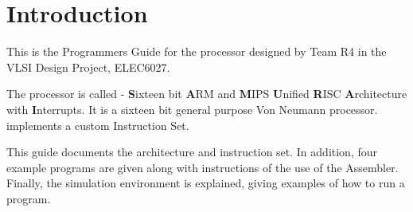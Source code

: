 
\section{Introduction}


This is the Programmers Guide for the processor designed by Team R4 in the VLSI Design Project, ELEC6027. 

The processor is called \samurai{} - \textbf{S}ixteen bit \textbf{A}RM and \textbf{M}IPS \textbf{U}nified \textbf{R}ISC \textbf{A}rchitecture with \textbf{I}nterrupts.
It is a sixteen bit general purpose Von Neumann processor. 
\samurai{} implements a custom Instruction Set. 

This guide documents the architecture and instruction set. 
In addition, four example programs are given along with instructions of the use of the Assembler. 
Finally, the simulation environment is explained, giving examples of how to run a program. 
